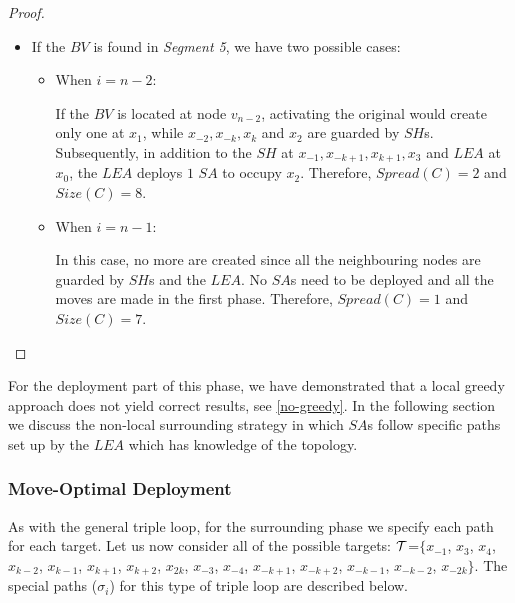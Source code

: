 \begin{proof}
\begin{itemize}
\item If the $BV$ is found in {\em Segment 5}, we have two possible cases:


\begin{itemize}
\item When $ i = n-2$:

If the $BV$ is located at  node $v_{n-2}$, activating the original \bv would create only one \bv at $x_{1}$, while $x_{-2},x_{-k},x_{k}$ and $x_{2}$ are guarded by $SH$s. Subsequently, in addition to the $SH$ at $x_{-1},x_{-k+1},x_{k+1},x_{3}$ and $LEA$ at $x_{0}$, the $LEA$ deploys $1$  $SA$ to occupy $x_{2}$. Therefore, $Spread(C)=2$ and $Size(C)=8$.

\item  When $i=n-1$: %
 
In this case, no more \bvs are created since all the neighbouring nodes are guarded by $SH$s and the $LEA$. No $SA$s need to be deployed and all the moves are made in the first phase. Therefore, $Spread(C)=1$ and $Size(C)=7$.  
\end{itemize}
\end{itemize}
\end{proof}

For the deployment part of this phase, we have demonstrated that a local greedy approach does not yield correct results, see \ref{no-greedy}. In the following section we discuss the non-local surrounding strategy in which  $SA$s follow  specific paths set up by the $LEA$ which has  knowledge of the topology.



\subsubsection{Move-Optimal Deployment}
As with the general triple loop, for the surrounding phase we specify each path for each target. Let us now consider all of the possible targets: ${\cal T}$=$\{x_{-1}$, $ x_{3}$,  $x_{4}$, $x_{k-2}$, $x_{k-1}$, $x_{k+1}$, $x_{k+2}$, $x_{2k}$, $x_{-3}$, $x_{-4}$, $x_{-k+1}$, $x_{-k+2}$, $x_{-k-1}$, $x_{-k-2}$, $x_{-2k}\}$.  The  special paths ($\sigma_i$) for this type of triple loop are described below. 

 
 
